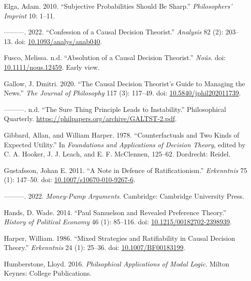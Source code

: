 \documentclass[
  10pt,
  letterpaper,
  DIV=11,
  numbers=noendperiod,
  twoside]{scrartcl}
\newlength{\cslhangindent}
\newenvironment{CSLReferences}[2] %
 {\begin{list}{}{%
  \setlength{\itemindent}{0pt}
  \setlength{\leftmargin}{0pt}
  \setlength{\parsep}{0pt}
  \ifodd #1
   \setlength{\leftmargin}{\cslhangindent}
   \setlength{\itemindent}{-1\cslhangindent}
  \fi
  \setlength{\itemsep}{#2\baselineskip}}}
 {\end{list}}
\begin{document}
\begin{CSLReferences}{1}{0}
Elga, Adam. 2010. {``Subjective Probabilities Should Be Sharp.''}
\emph{Philosophers' Imprint} 10: 1--11.

---------. 2022. {``Confession of a Causal Decision Theorist.''}
\emph{Analysis} 82 (2): 203--13. doi:
\href{https://doi.org/10.1093/analys/anab040}{10.1093/analys/anab040}.

Fusco, Melissa. n.d. {``Absolution of a Causal Decision Theorist.''}
\emph{No{û}s}. doi:
\href{https://doi.org/10.1111/nous.12459}{10.1111/nous.12459}. Early
view.

Gallow, J. Dmitri. 2020. {``The Causal Decision Theorist's Guide to
Managing the News.''} \emph{The Journal of Philosophy} 117 (3): 117--49.
doi:
\href{https://doi.org/10.5840/jphil202011739}{10.5840/jphil202011739}.

---------. n.d. {``The Sure Thing Principle Leads to Instability.''}
Philosophical Quarterly.
\url{https://philpapers.org/archive/GALTST-2.pdf}.

Gibbard, Allan, and William Harper. 1978. {``Counterfactuals and Two
Kinds of Expected Utility.''} In \emph{Foundations and Applications of
Decision Theory}, edited by C. A. Hooker, J. J. Leach, and E. F.
McClennen, 125--62. Dordrecht: Reidel.

Gustafsson, Johan E. 2011. {``A Note in Defence of Ratificationism.''}
\emph{Erkenntnis} 75 (1): 147--50. doi:
\href{https://doi.org/10.1007/s10670-010-9267-6}{10.1007/s10670-010-9267-6}.

---------. 2022. \emph{Money-Pump Arguments}. Cambridge: Cambridge
University Press.

Hands, D. Wade. 2014. {``{Paul Samuelson and Revealed Preference
Theory}.''} \emph{History of Political Economy} 46 (1): 85--116. doi:
\href{https://doi.org/10.1215/00182702-2398939}{10.1215/00182702-2398939}.

Harper, William. 1986. {``Mixed Strategies and Ratifiability in Causal
Decision Theory.''} \emph{Erkenntnis} 24 (1): 25--36. doi:
\href{https://doi.org/10.1007/BF00183199}{10.1007/BF00183199}.

Humberstone, Lloyd. 2016. \emph{Philsophical Applications of Modal
Logic}. Milton Keynes: College Publications.


\end{CSLReferences}
\end{document}
